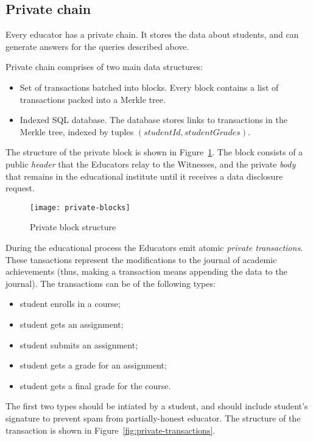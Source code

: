 \subsection{Private chain}

Every educator has a private chain. It stores the data about students, and can generate answers for the queries described above.

Private chain comprises of two main data structures:
\begin{itemize}
\item Set of transactions batched into blocks. Every block contains a list of transactions packed into a Merkle tree.
\item Indexed SQL database. The database stores links to transactions in the Merkle tree, indexed by tuples $(studentId, studentGrades)$.
\end{itemize}

The structure of the private block is shown in Figure~\ref{fig:privateblocks}. The block consists of a public \textit{header} that the Educators relay to the Witnesses, and the private \textit{body} that remains in the educational institute until it receives a data disclosure request.

\begin{figure}[ht]
\centering
\texttt{[image: private-blocks]}
\caption{Private block structure}
\label{fig:privateblocks}
\end{figure}

During the educational process the Educators emit atomic \textit{private transactions}. These tansactions represent the modifications to the journal of academic achievements (thus, making a transaction means appending the data to the journal). The transactions can be of the following types:
\begin{itemize}
\item student enrolls in a course;
\item student gets an assignment;
\item student submits an assignment;
\item student gets a grade for an assignment;
\item student gets a final grade for the course.
\end{itemize}

The first two types should be intiated by a student, and should include student's signature to prevent spam from partially-honest educator.
The structure of the transaction is shown in Figure~\ref{fig:private-transactions}.

